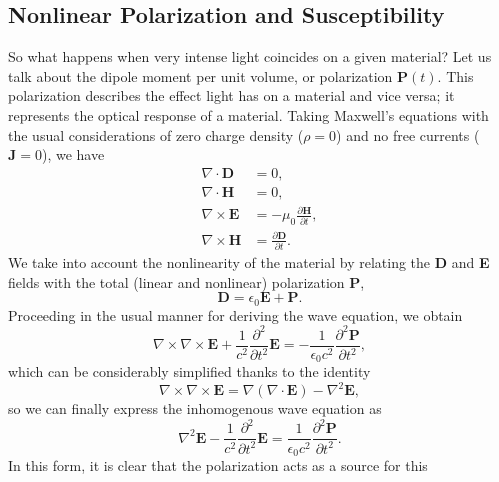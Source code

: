 
\subsection{Nonlinear Polarization and Susceptibility}

So what happens when very intense light coincides on a given material? Let us
talk about the dipole moment per unit volume, or polarization $\mathbf{P}(t)$.
This polarization describes the effect light has on a material and vice versa;
it represents the optical response of a material. Taking Maxwell's equations
with the usual considerations of zero charge density ($\rho=0$) and no free
currents ($\mathbf{J}=0$), we have
\begin{align}
\nabla\cdot\mathbf{D} &= 0,\label{eq_max_1}\\
\nabla\cdot\mathbf{H} &= 0,\\
\nabla\times\mathbf{E} &= -\mu_{0}\frac{\partial\mathbf{H}}{\partial t},\\
\nabla\times\mathbf{H} &= \frac{\partial\mathbf{D}}{\partial t}.
\end{align}
We take into account the nonlinearity of the material by relating the \textbf{D}
and \textbf{E} fields with the total (linear and nonlinear) polarization
\textbf{P},
\begin{equation}
\mathbf{D} = \epsilon_{0}\mathbf{E} + \mathbf{P}.
\end{equation}
Proceeding in the usual manner for deriving the wave equation, we obtain
\begin{equation}
\nabla\times\nabla\times\mathbf{E} 
   + \frac{1}{c^{2}}\frac{\partial^{2}}{\partial t^{2}}\mathbf{E}
= -\frac{1}{\epsilon_{0}c^{2}}\frac{\partial^{2}\mathbf{P}}{\partial t^{2}},
\end{equation}
which can be considerably simplified thanks to the identity
\begin{equation}
\nabla\times\nabla\times\mathbf{E}
= \nabla\left(\nabla\cdot\mathbf{E}\right)-\nabla^{2}\mathbf{E},
\end{equation}
so we can finally express the inhomogenous wave equation as
\begin{equation}
\nabla^{2}\mathbf{E} - \frac{1}{c^{2}}\frac{\partial^{2}}{\partial t^{2}}\mathbf{E}
= \frac{1}{\epsilon_{0}c^{2}}\frac{\partial^{2}\mathbf{P}}{\partial t^{2}}.
\end{equation}
In this form, it is clear that the polarization acts as a source for this
